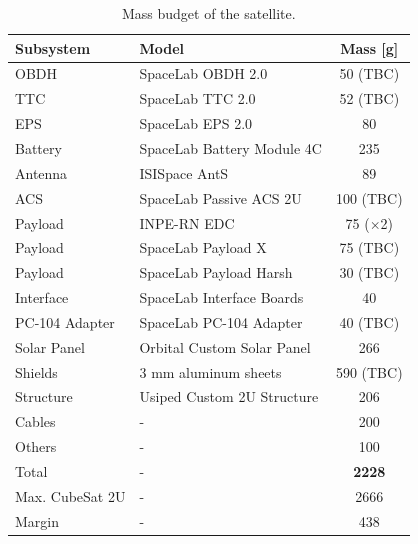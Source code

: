 \begin{table}[!h]
    \centering
    \begin{tabular}{llc}
        \toprule[1.5pt]
        \textbf{Subsystem} & \textbf{Model} & \textbf{Mass [g]} \\
        \midrule
        OBDH            & SpaceLab OBDH 2.0             & 50 (TBC) \\
        TTC             & SpaceLab TTC 2.0              & 52 (TBC) \\
        EPS             & SpaceLab EPS 2.0              & 80 \\
        Battery         & SpaceLab Battery Module 4C    & 235 \\
        Antenna         & ISISpace AntS                 & 89 \\
        ACS             & SpaceLab Passive ACS 2U       & 100 (TBC) \\
        Payload         & INPE-RN EDC                   & 75 ($\times$2) \\
        Payload         & SpaceLab Payload X            & 75 (TBC) \\
        Payload         & SpaceLab Payload Harsh        & 30 (TBC) \\
        Interface       & SpaceLab Interface Boards     & 40 \\
        PC-104 Adapter  & SpaceLab PC-104 Adapter       & 40 (TBC) \\
        Solar Panel     & Orbital Custom Solar Panel    & 266 \\
        Shields         & 3 mm aluminum sheets          & 590 (TBC) \\
        Structure       & Usiped Custom 2U Structure    & 206 \\
        Cables          & -                             & 200 \\
        Others          & -                             & 100 \\
        \midrule
        Total           & -                             & \textbf{2228} \\
        Max. CubeSat 2U & -                             & 2666 \\
        Margin          & -                             & 438 \\
        \bottomrule[1.5pt]
    \end{tabular}
    \caption{Mass budget of the satellite.}
    \label{tab:mass-budget}
\end{table}

